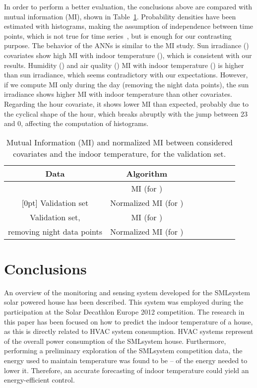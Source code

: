 \documentclass[energies,article,accept,moreauthors,pdftex,12pt,a4paper]{mdpi}
\newcommand{\anns}{ANNs\xspace}
\newcommand{\smlsystem}{SMLsystem\xspace}
\begin{document}
In order to perform a better evaluation, the conclusions above are compared with
mutual information (MI), shown in Table~\ref{tab:MI}. Probability densities have
been estimated with histograms, making the assumption of independence between
time points, which is not true for time series~\cite{2009:arxiv:papana}, but
is enough for our contrasting purpose. The behavior of the \anns is similar to the MI
study. Sun irradiance () covariates show high MI with indoor temperature
(), which is consistent with our results. Humidity () and air quality ()
MI with indoor temperature () is higher than sun irradiance, which seems
contradictory with our expectations. However, if we compute MI only during the day
(removing the night data points), the sun irradiance shows higher MI with indoor
temperature than other covariates. Regarding the hour covariate, it shows lower
MI than expected, probably due to the cyclical shape of the hour, which breaks abruptly
with the jump between 23 and 0, affecting the computation of histograms.

\begin{table}[H]
 \footnotesize \centering
 \begin{tabular}{cccccccc}
 \toprule
  {\bf Data}& {\bf Algorithm}& {\boldmath } & {\boldmath } & {\boldmath } & {\boldmath } & {\boldmath } & {\boldmath }\\ \midrule
 & MI (for ) &  &  &  &  &  & \\
\cline {2-8}
 \raisebox{1.5ex}[0pt] {Validation set}&Normalized MI (for ) &  &  &  &  &  & \\
 \hline
 Validation set,  &MI (for ) &  &  &  &  &  & \\
\cline {2-8}
 removing night data points & Normalized MI (for ) &  &  &  &  &  & \\
 \bottomrule
 \end{tabular}
 \caption{Mutual Information (MI) and normalized MI between
 considered covariates and the indoor temperature, for the validation
 set.}\label{tab:MI}
\end{table}

\section{Conclusions}

An overview of the monitoring and sensing system developed for the \smlsystem
solar powered house has been described. This system was employed during the participation at the Solar Decathlon Europe 2012 competition. The research in
this paper has been focused on how to predict the indoor temperature of a house,
as this is directly related to HVAC system consumption. HVAC systems represent
 of the overall power consumption of the \smlsystem house. Furthermore,
performing a preliminary exploration of the \smlsystem competition data, the energy
used to maintain temperature was found to be -- of the energy needed
to lower it. Therefore, an accurate forecasting of indoor temperature could
yield an energy-efficient control.
\end{document}
